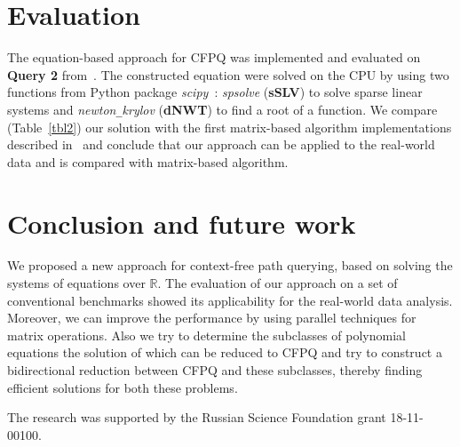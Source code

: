 \documentclass[sigconf, 10pt]{acmart}
\begin{document}
\section{Evaluation}

The equation-based approach for CFPQ was implemented and evaluated on \textbf{Query 2} from~\cite{azimov2018context}.
The constructed equation were solved on the CPU by using two functions from Python package \textit{scipy}~\cite{scipy}:
\textit{spsolve} (\textbf{sSLV}) to solve sparse linear systems
and
\textit{newton\texttt{\_}krylov} (\textbf{dNWT}) to find a root of a function.
We compare (Table~\ref{tbl2}) our solution with the first matrix-based algorithm implementations described in~\cite{azimov2018context} and conclude that 
our approach can be applied to the real-world data and is compared with matrix-based algorithm.

\begin{table}[h]
\centering
\caption{Evaluation results for Query 2 (in ms)}
\label{tbl2}
\vspace{-4mm}
\end{table}


\section{Conclusion and future work}

We proposed a new approach for context-free path querying, based on solving the systems of equations over $\mathbb{R}$.
The evaluation of our approach on a set of conventional benchmarks showed its applicability for the real-world data analysis.
Moreover, we can improve the performance by using parallel techniques for matrix operations.
Also we try to determine the subclasses of polynomial equations the solution of which can be reduced to CFPQ and try to construct a bidirectional reduction between CFPQ and these subclasses, thereby finding efficient solutions for both these problems.



\begin{acks}
The research was supported by the Russian Science Foundation grant 18-11-00100.
\end{acks}



\balance

\end{document}
